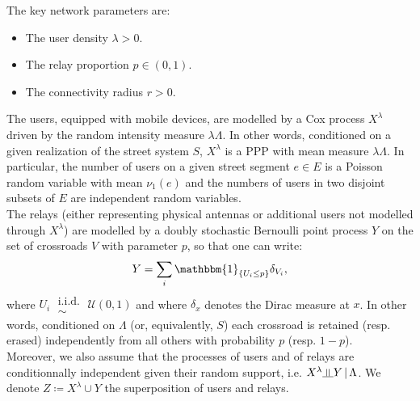 \documentclass[10pt,a4paper]{amsart}
\theoremstyle{exampstyle}
\newtheorem{Proposition}{Proposition}
\newenvironment{Proof}{\noindent{\textit{Proof.}}}{%
\hspace*{\fill}$\Box$\par\vskip2ex}
\theoremstyle{exampnotations}
\newcommand{\indep}{\rotatebox[origin=c]{90}{$\models$}}
\begin{document}
The key network parameters are:
\begin{itemize}
\item The user density $\lambda > 0$.
\item The relay proportion $p \in \left(0,1\right)$.
\item The connectivity radius $r > 0$. \\
\end{itemize}

The users, equipped with mobile devices, are modelled by a Cox process $X^{\lambda}$ driven by the random intensity measure $\lambda \Lambda$. In other words, conditioned on a given realization of the street system $S$, $X^{\lambda}$ is a PPP with mean measure $\lambda \Lambda$. In particular, the number of users on a given street segment $e \in E$ is a Poisson random variable with mean $\nu_{1}(e)$ and the numbers of users in two disjoint subsets of $E$ are independent random variables. \\
\indent The relays (either representing physical antennas or additional users not modelled through $X^{\lambda}$) are modelled by a doubly stochastic Bernoulli point process $Y$ on the set of crossroads $V$ with parameter $p$, so that one can write:
\begin{equation*}
Y = \sum_{i} \mathbbm{1}_{\lbrace U_{i} \leq p \rbrace } \delta_{V_{i}},
\end{equation*}
where $U_{i} \;\substack{ \text{i.i.d.} \\ \sim} \; \mathcal{U}(0,1)$ and where $\delta_{x}$ denotes the Dirac measure at $x$. In other words, conditioned on $\Lambda$ (or, equivalently, $S$) each crossroad is retained (resp. erased) independently from all others with probability $p$ (resp. $1-p$). \\
\noindent Moreover, we also assume that the processes of users and of relays  are conditionnally independent given their random support, i.e. $X^{\lambda} \indep Y \, \vert \,  \Lambda$. We denote $Z \coloneqq X^{\lambda} \cup Y$ the superposition of users and relays. 
\end{document}
